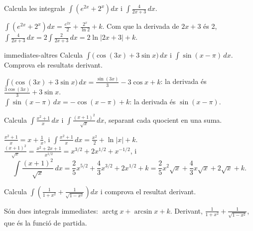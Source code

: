 \begin{apartats}

Calcula les integrals $\displaystyle\int\left(e^{2x}+2^x\right)dx$ i
$\displaystyle\int\frac{4}{2x+3}\,dx$.

\begin{solucio}
$\displaystyle\int\left(e^{2x}+2^x\right)dx=\frac{e^{2x}}{2}+\frac{2^x}{\ln2}+k$. Com que la derivada de
$2x+3$ és 2, $\displaystyle\int\frac{4}{2x+3}\,dx=2\int\frac{2}{2x+3}\,dx=2\ln|2x+3|+k$.
\end{solucio}

\begin{tria}{immediates-altres}
Calcula $\displaystyle\int\bigl(\cos(3x)+3\sin x\bigr)\,dx$ i $\displaystyle\int\sin(x-\pi)\,dx$.
Comprova els resultats derivant.

\begin{solucio}
$\displaystyle\int\bigl(\cos(3x)+3\sin x\bigr)\,dx=\frac{\sin(3x)}{3}-3\cos x+k$: la derivada és
$\frac{3\cos(3x)}{3}+3\sin x$.\\
$\displaystyle\int\sin(x-\pi)\,dx=-\cos(x-\pi)+k$: la derivada és $\sin(x-\pi)$.
\end{solucio}

Calcula $\displaystyle\int\frac{x^2+1}{x}\,dx$ i $\displaystyle\int\frac{(x+1)^2}{\sqrt x}\,dx$,
separant cada quocient en una suma.

\begin{solucio}
$\frac{x^2+1}{x}=x+\frac1x$, i $\displaystyle\int\frac{x^2+1}{x}\,dx=\frac{x^2}{2}+\ln|x|+k$.\\
$\frac{(x+1)^2}{\sqrt x}=\frac{x^2+2x+1}{x^{1/2}}=x^{3/2}+2x^{1/2}+x^{-1/2}$, i
\[
\int\frac{(x+1)^2}{\sqrt x}\,dx=\frac25x^{5/2}+\frac43x^{3/2}+2x^{1/2}+k
=\frac25x^2\sqrt x+\frac43x\sqrt x+2\sqrt x+k.
\]
\end{solucio}
\end{tria}

\begin{nomesllarg}
Calcula $\displaystyle\int\left(\frac{1}{1+x^2}+\frac{1}{\sqrt{1-x^2}}\right)dx$ i comprova el
resultat derivant.

\begin{solucio}
Són dues integrals immediates: $\operatorname{arctg}x+\arcsin x+k$. Derivant,
$\frac{1}{1+x^2}+\frac{1}{\sqrt{1-x^2}}$, que és la funció de partida.
\end{solucio}
\end{nomesllarg}

\end{apartats}
